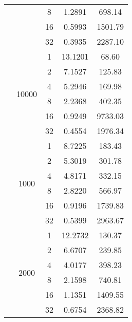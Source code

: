 \begin{tabularx}{\textwidth}{@{} c c c c c @{}}
                            &                       & 8  & 1.2891 & 698.14  \\
                            &                       & 16 & 0.5993 & 1501.79 \\
                            &                       & 32 & 0.3935 & 2287.10 \\
                            \cmidrule{2-5}
                            & \multirow{6}{*}{10000} & 1  & 13.1201 & 68.60   \\
                            &                        & 2  & 7.1527  & 125.83  \\
                            &                        & 4  & 5.2946  & 169.98  \\
                            &                        & 8  & 2.2368  & 402.35  \\
                            &                        & 16 & 0.9249  & 9733.03 \\
                            &                        & 32 & 0.4554  & 1976.34 \\
\midrule\enlargethispage{-\baselineskip}
    \multirow{24}{*}{40000} & \multirow{6}{*}{1000} & 1  & 8.7225 & 183.43  \\
                            &                       & 2  & 5.3019 & 301.78  \\
                            &                       & 4  & 4.8171 & 332.15  \\
                            &                       & 8  & 2.8220 & 566.97  \\
                            &                       & 16 & 0.9196 & 1739.83 \\
                            &                       & 32 & 0.5399 & 2963.67 \\
                            \cmidrule{2-5}
                            & \multirow{6}{*}{2000} & 1  & 12.2732 & 130.37  \\
                            &                       & 2  & 6.6707  & 239.85  \\
                            &                       & 4  & 4.0177  & 398.23  \\
                            &                       & 8  & 2.1598  & 740.81  \\
                            &                       & 16 & 1.1351  & 1409.55 \\
                            &                       & 32 & 0.6754  & 2368.82 \\

\end{tabularx}
